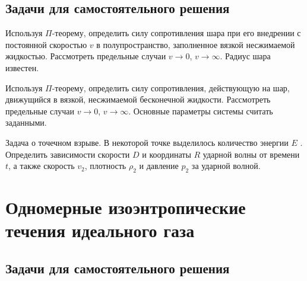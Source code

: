 \documentclass[a4paper, 14pt]{extarticle}
\begin{document}
\subsection{Задачи для самостоятельного решения}

\begin{problems}
	
	\item Используя $\Pi$-теорему, определить силу сопротивления шара при его внедрении с постоянной скоростью $v$ в полупространство, заполненное вязкой несжимаемой жидкостью. Рассмотреть предельные случаи $v \to 0$, $v \to \infty$. Радиус шара известен.
	
	\item
	Используя  $\Pi$-теорему, определить силу сопротивления, действующую на шар, движущийся в вязкой, несжимаемой бесконечной жидкости. Рассмотреть предельные случаи $v \to 0$, $v \to \infty$. Основные параметры системы считать заданными.
	
	\item
	Задача о точечном взрыве. В некоторой точке выделилось количество энергии $E$ . Определить зависимости скорости $D$ и координаты $R$ ударной волны от времени $t$, а также скорость $v_2$, плотность $\rho_2$ и давление $p_2$ за ударной волной. 

\end{problems}

\section{Одномерные изоэнтропические течения идеального газа }

\subsection{Задачи для самостоятельного решения}
\end{document}
